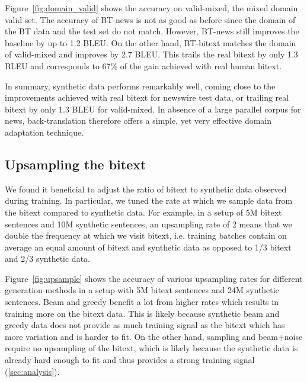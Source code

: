 \documentclass[11pt,a4paper]{article}
\begin{document}
Figure~\ref{fig:domain_valid} shows the accuracy on valid-mixed, the mixed domain valid set.
The accuracy of BT-news is not as good as before since the domain of the BT data and the test set do not match.
However, BT-news still improves the baseline by up to 1.2 BLEU.
On the other hand, BT-bitext matches the domain of valid-mixed and improves by 2.7 BLEU.
This trails the real bitext by only 1.3 BLEU and corresponds to 67\% of the gain achieved with real human bitext.

In summary, synthetic data performs remarkably well, coming close to the improvements achieved with real bitext for newswire test data, or trailing real bitext by only 1.3 BLEU for valid-mixed. 
In absence of a large parallel corpus for news, back-translation therefore offers a simple, yet very effective domain adaptation technique.



\subsection{Upsampling the bitext}
\label{sec:upsample}

We found it beneficial to adjust the ratio of bitext to synthetic data observed during training.
In particular, we tuned the rate at which we sample data from the bitext compared to synthetic data. 
For example, in a setup of 5M bitext sentences and 10M synthetic sentences, an upsampling rate of 2 means that we double the frequency at which we visit bitext, i.e. training batches contain on average an equal amount of bitext and synthetic data as opposed to 1/3 bitext and 2/3 synthetic data.

Figure~\ref{fig:upsample} shows the accuracy of various upsampling rates for different generation methods in a setup with 5M bitext sentences and 24M synthetic sentences.
Beam and greedy benefit a lot from higher rates which results in training more on the bitext data. 
This is likely because synthetic beam and greedy data does not provide as much training signal as the bitext which has more variation and is harder to fit.
On the other hand, sampling and beam+noise require no upsampling of the bitext, which is likely because the synthetic data is already hard enough to fit and thus provides a strong training signal (\textsection\ref{sec:analysis}).
\end{document}
